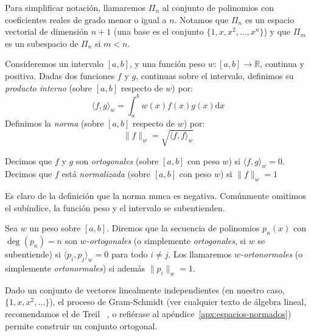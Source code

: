  Para simplificar notación,
  llamaremos \(\Pi_n\)
  al conjunto de polinomios con coeficientes reales
  de grado menor o igual a \(n\).
  Notamos que \(\Pi_n\) es un espacio vectorial de dimensión \(n + 1\)
  (una base es el conjunto \(\{1, x, x^2, \dotsc, x^n\}\))
  y que \(\Pi_m\) es un subespacio de \(\Pi_n\) si \(m < n\).

  \begin{definition}
    \label{def:producto-interno}
    Consideremos un intervalo \([a, b]\),
    y una función peso \(w \colon [a, b] \to \mathbb{R}\),
    continua y positiva.
    Dadas dos funciones \(f\) y \(g\),
    continuas sobre el intervalo,
    definimos su \emph{producto interno}
    (sobre \([a, b]\) respecto de \(w\)) por:
    \begin{equation*}
      \langle f, g \rangle_w
        = \int_a^b w(x) f(x) g(x) \mathrm{d} x
    \end{equation*}
    Definimos la \emph{norma}
    (sobre \([a, b]\) respecto de \(w\)) por:
    \begin{equation*}
      \lVert f \rVert_w
        = \sqrt{\langle f, f \rangle_w}
    \end{equation*}

    Decimos que \(f\) y \(g\) son \emph{ortogonales}
    (sobre \([a, b]\) con peso \(w\))
    si \(\langle f, g \rangle_w = 0\).
    Decimos que \(f\) está \emph{normalizada}
    (sobre \([a, b]\) con peso \(w\))
    si \(\lVert f \rVert_w = 1\)
  \end{definition}
  Es claro de la definición que la norma nunca es negativa.
  Comúnmente omitimos el subíndice,
  la función peso y el intervalo se subentienden.

  \begin{definition}
    \label{def:polinomios-ortogonales}
    Sea \(w\) un peso sobre \([a, b]\).
    Diremos que la secuencia de polinomios \(p_n(x)\)
    con \(\deg(p_n) = n\)
    son \emph{\(w\)\nobreakdash-ortogonales}
    (o simplemente \emph{ortogonales},
     si \(w\) se subentiende)
    si \(\langle p_i, p_j \rangle_w = 0\) para todo \(i \ne j\).
    Los llamaremos \emph{\(w\)\nobreakdash-orto\-nor\-ma\-les}
    (o simplemente \emph{ortonormales})
    si además \(\lVert p_i \rVert_w = 1\).
  \end{definition}
  Dado un conjunto de vectores linealmente independientes
  (en nuestro caso,
   \(\{ 1, x, x^2, \dotsc \}\)),
  el proceso de Gram-Schmidt
  (ver cualquier texto de álgebra lineal,
   recomendamos el de Treil~%
     \cite{treil17:_linear_algeb_done_wrong},
   o refiérase al apéndice~\ref{apx:espacios-normados})
  permite construir un conjunto ortogonal.

